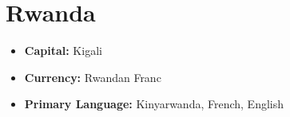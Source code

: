 \documentclass[a4paper,100pt,twoside]{book}
\begin{document}
\section*{\Huge Rwanda}
\vspace{5mm} %
\begin{itemize}
	\item \textbf{Capital:} Kigali
	\item \textbf{Currency:} Rwandan Franc
	\item \textbf{Primary Language:} Kinyarwanda, French, English
\end{itemize}
\end{document}
